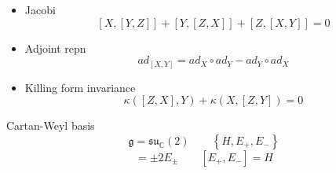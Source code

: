 \begin{itemize}
  \item Jacobi
    \begin{equation}
      \label{eq:16-alpha}
      [X, [Y, Z]] + [Y, [Z, X]] + [Z, [X, Y]] = 0
    \end{equation}
  \item Adjoint repn
    \begin{equation}
      \label{eq:16-beta}
      ad_{[X, Y]} = ad_X \circ ad_Y - ad_Y \circ ad_X
    \end{equation}
  \item Killing form invariance
    \begin{equation}
      \label{eq:16-delta}
      \kappa([Z, X], Y) + \kappa(X, [Z, Y]) =0
    \end{equation}
\end{itemize}

Cartan-Weyl basis
\begin{equation}
  \mathfrak{g} = \mathfrak{su}_{\mathbb{C}}(2) \qquad \left\{ H, E_+, E_- \right\}
\end{equation}
\begin{equation}
  [H, E_{\pm}] = \pm 2E_{\pm} \qquad [E_+, E_-] = H
\end{equation}

